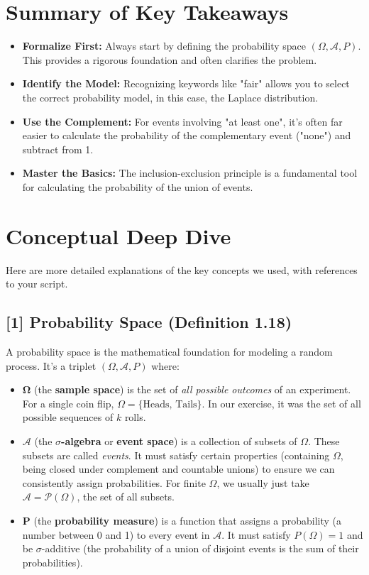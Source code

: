\documentclass[11pt,a4paper]{article}
\begin{document}
\section{Summary of Key Takeaways}
\begin{itemize}
    \item \textbf{Formalize First:} Always start by defining the probability space $(\Omega, \mathcal{A}, P)$. This provides a rigorous foundation and often clarifies the problem.
    \item \textbf{Identify the Model:} Recognizing keywords like "fair" allows you to select the correct probability model, in this case, the Laplace distribution.
    \item \textbf{Use the Complement:} For events involving "at least one", it's often far easier to calculate the probability of the complementary event ("none") and subtract from 1.
    \item \textbf{Master the Basics:} The inclusion-exclusion principle is a fundamental tool for calculating the probability of the union of events.
\end{itemize}

\newpage
\section*{Conceptual Deep Dive}
Here are more detailed explanations of the key concepts we used, with references to your script.

\hypertarget{concept:probspace}{}
\subsection*{[1] Probability Space (Definition 1.18)}
A probability space is the mathematical foundation for modeling a random process. It's a triplet $(\Omega, \mathcal{A}, P)$ where:
\begin{itemize}
    \item $\mathbf{\Omega}$ (the \textbf{sample space}) is the set of \textit{all possible outcomes} of an experiment. For a single coin flip, $\Omega = \{\text{Heads, Tails}\}$. In our exercise, it was the set of all possible sequences of $k$ rolls.
    \item $\mathbf{\mathcal{A}}$ (the \textbf{$\sigma$-algebra} or \textbf{event space}) is a collection of subsets of $\Omega$. These subsets are called \textit{events}. It must satisfy certain properties (containing $\Omega$, being closed under complement and countable unions) to ensure we can consistently assign probabilities. For finite $\Omega$, we usually just take $\mathcal{A} = \mathcal{P}(\Omega)$, the set of all subsets.
    \item $\mathbf{P}$ (the \textbf{probability measure}) is a function that assigns a probability (a number between 0 and 1) to every event in $\mathcal{A}$. It must satisfy $P(\Omega) = 1$ and be $\sigma$-additive (the probability of a union of disjoint events is the sum of their probabilities).
\end{itemize}
\end{document}
